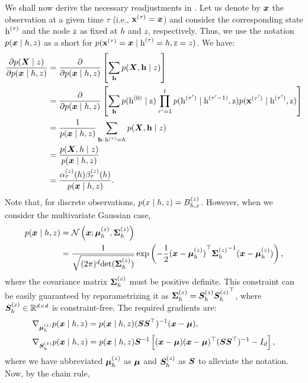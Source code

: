 We shall now derive the necessary readjustments in . Let us denote by ${\bm{x}}$ the observation at a given time $\tau$ (i.e., ${\mathbf{x}}^{(\tau)}={\bm{x}}$) and consider the corresponding state ${\textnormal{h}}^{(\tau)}$ and the node ${\textnormal{z}}$ as fixed at $h$ and $z$, respectively. Thus, we use the notation $p({\bm{x}} \mid h, z)$ as a short for $p({\mathbf{x}}^{(\tau)}={\bm{x}} \mid {\textnormal{h}}^{(\tau)}=h, {\textnormal{z}}=z)$. We have:
\begin{align}
\frac{\partial p({\bm{X}} \mid z)}{\partial p({\bm{x}} \mid h, z)} &= \frac{\partial}{\partial p({\bm{x}} \mid h, z)} \left[\sum_{{\mathbf{h}}} p({\bm{X}}, {\mathbf{h}} \mid z)  \right] \nonumber\\
&= \frac{\partial}{\partial p({\bm{x}} \mid h, z)} \left[\sum_{{\mathbf{h}}} p({\textnormal{h}}^{(0)} \mid {\textnormal{z}}) \prod_{\tau'=1}^t p({\textnormal{h}}^{(\tau')} \mid {\textnormal{h}}^{(\tau'-1)},{\textnormal{z}}) p({\mathbf{x}}^{(\tau')} \mid {\textnormal{h}}^{(\tau')},{\textnormal{z}})\right] \nonumber\\
&= \frac{1}{p({\bm{x}} \mid h, z)} \sum_{{\mathbf{h}}:\, {\textnormal{h}}^{(\tau)}=h} p({\bm{X}}, {\mathbf{h}} \mid z) \nonumber\\
&= \frac{p({\bm{X}}, h \mid z)}{p({\bm{x}} \mid h, z)} \nonumber\\
&= \frac{\alpha_{\tau}^{(z)}(h) \beta_{\tau}^{(z)}(h)}{p({\bm{x}} \mid h, z)}.
\end{align}
Note that, for discrete observations, $p(x \mid h, z) = {B}^{(z)}_{h,x}$. However, when we consider the multivariate Gaussian case,
\begin{align}
p({\bm{x}} \mid h, z) &= \mathcal{N}\left({\bm{x}}; {\bm{\mu}}^{(z)}_h, {\bm{\Sigma}}^{(z)}_h\right) \nonumber\\
&= \frac{1}{\sqrt{(2\pi)^d \mathrm{det}({\bm{\Sigma}}^{(z)}_h)}} \exp \left(-\frac{1}{2} {({\bm{x}} - {\bm{\mu}}^{(z)}_h)}^\top {{\bm{\Sigma}}^{(z)}_h}^{-1} ({\bm{x}} - {\bm{\mu}}^{(z)}_h)\right),
\end{align}
where the covariance matrix ${\bm{\Sigma}}^{(z)}_h$ must be positive definite. This constraint can be easily guaranteed by reparametrizing it as ${\bm{\Sigma}}^{(z)}_h = {\bm{S}}^{(z)}_h {{\bm{S}}^{(z)}_h}^\top$, where ${\bm{S}}^{(z)}_h \in {\mathbb{R}}^{d \times d}$ is constraint-free. The required gradients are:
\begin{align}
&\nabla_{{\bm{\mu}}^{(z)}_h} p({\bm{x}} \mid h, z) = p({\bm{x}} \mid h, z) ({\bm{S}} {\bm{S}}^\top)^{-1} ({\bm{x}} - {\bm{\mu}}), \\
&\nabla_{{\bm{S}}^{(z)}_h} p({\bm{x}} \mid h, z) = p({\bm{x}} \mid h, z) {\bm{S}}^{-1} \left[ ({\bm{x}} - {\bm{\mu}}) ({\bm{x}} - {\bm{\mu}})^\top ({\bm{S}} {\bm{S}} ^\top)^{-1} - I_d\right],
\end{align}
where we have abbreviated ${\bm{\mu}}^{(z)}_h$ as ${\bm{\mu}}$ and ${\bm{S}}^{(z)}_h$ as ${\bm{S}}$ to alleviate the notation. Now, by the chain rule,
